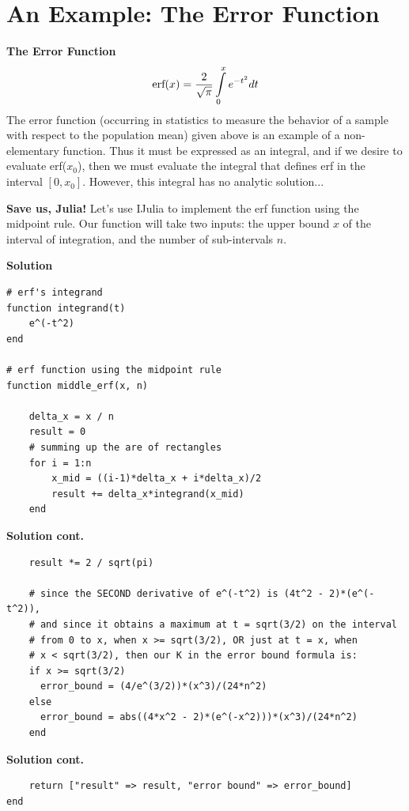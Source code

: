 \documentclass[xcolor=dvipsnames]{beamer}
\begin{document}
\section{An Example: The Error Function}
\begin{frame}[fragile]
{\bf The Error Function}
\[\textnormal{erf}(x) = \frac{2}{\sqrt{\pi}}\int\limits_0^xe^{-t^2}dt\]
The error function (occurring in statistics to measure the behavior of a sample with respect to the population mean) given above is an example of a non-elementary function.
\vfill \pause
Thus it must be expressed as an integral, and if we desire to evaluate erf($x_0$), then we must evaluate the integral that defines erf in the interval $[0,x_0]$.
\vfill \pause
However, this integral has no analytic solution...
\end{frame}

\begin{frame}
{\bf Save us, Julia!}
Let's use IJulia to implement the erf function using the midpoint rule. Our function will take two inputs: the upper bound $x$ of the interval of integration, and the number of sub-intervals $n$.\\
\end{frame}

\begin{frame}[fragile]
{\bf Solution} 
\begin{lstlisting}
# erf's integrand
function integrand(t)
    e^(-t^2)
end    

# erf function using the midpoint rule
function middle_erf(x, n)

    delta_x = x / n
    result = 0
    # summing up the are of rectangles
    for i = 1:n
        x_mid = ((i-1)*delta_x + i*delta_x)/2
        result += delta_x*integrand(x_mid)
    end
\end{lstlisting}
\end{frame}

\begin{frame}[fragile]
{\bf Solution cont.} 
\begin{lstlisting}
    result *= 2 / sqrt(pi)
    
    # since the SECOND derivative of e^(-t^2) is (4t^2 - 2)*(e^(-t^2)),
    # and since it obtains a maximum at t = sqrt(3/2) on the interval 
    # from 0 to x, when x >= sqrt(3/2), OR just at t = x, when 
    # x < sqrt(3/2), then our K in the error bound formula is:
    if x >= sqrt(3/2)
      error_bound = (4/e^(3/2))*(x^3)/(24*n^2)
    else 
      error_bound = abs((4*x^2 - 2)*(e^(-x^2)))*(x^3)/(24*n^2)
    end    
\end{lstlisting}
\end{frame}

\begin{frame}[fragile]
{\bf Solution cont.} 
\begin{lstlisting}
    return ["result" => result, "error bound" => error_bound]
end
\end{lstlisting}
\end{frame}
\end{document}
